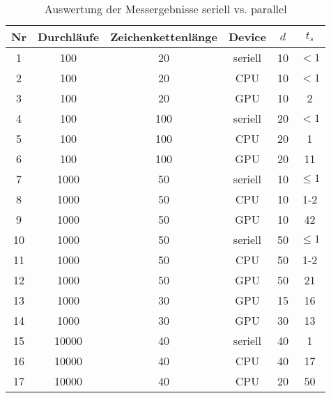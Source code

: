 \begin{table}[!h]
     \centering
    \begin{tabular}{cccccc}
        Nr  & Durchläufe  & Zeichenkettenlänge  & Device    & $d$ & $t_s$   \\
        \hline                                                     \hline
        1   & 100         & 20                  & seriell   & 10  & $<1$    \\
        2   & 100         & 20                  & CPU       & 10  & $<1$    \\
        3   & 100         & 20                  & GPU       & 10  & 2       \\
        \hline
        4   & 100         & 100                 & seriell   & 20  & $<1$    \\
        5   & 100         & 100                 & CPU       & 20  & 1       \\
        6   & 100         & 100                 & GPU       & 20  & 11      \\
        \hline
        7   & 1000        & 50                  & seriell   & 10  & $\le 1$ \\
        8   & 1000        & 50                  & CPU       & 10  & 1-2     \\
        9   & 1000        & 50                  & GPU       & 10  & 42      \\
        \hline
        10  & 1000        & 50                  & seriell   & 50  & $\le 1$ \\
        11  & 1000        & 50                  & CPU       & 50  & 1-2     \\
        12  & 1000        & 50                  & GPU       & 50  & 21      \\
        \hline
        13  & 1000        & 30                  & GPU       & 15  & 16      \\
        14  & 1000        & 30                  & GPU       & 30 & 13       \\
        \hline
        15  & 10000       & 40                  & seriell   & 40  & 1       \\
        16  & 10000       & 40                  & CPU       & 40  & 17      \\
        17  & 10000       & 40                  & CPU       & 20  & 50      \\
        \hline
    \end{tabular}
    \caption{Auswertung der Messergebnisse seriell vs. parallel}
    \label{tbl:results}
\end{table}
